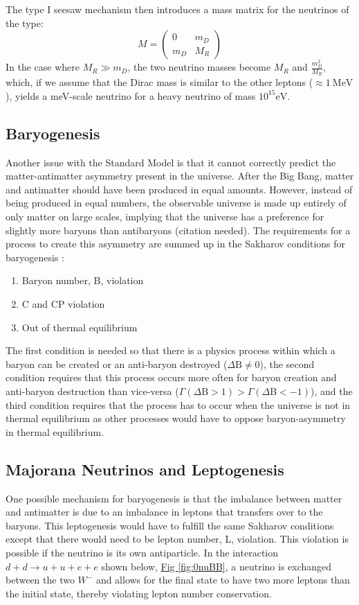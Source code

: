 \documentclass[12pt,a4paper]{article}
\begin{document}
The type I seesaw mechanism then introduces a mass matrix for the neutrinos of the type:
\begin{equation}
M =\begin{pmatrix}
0 & m_D \\
m_D & M_R
\end{pmatrix}
\end{equation}
In the case where $M_R \gg m_D$, the two neutrino masses become $M_R$ and $\frac{m_D^2}{M_R}$, which, if we assume that the Dirac mass is similar to the other leptons ($\approx 1~\textrm{MeV}$), yields a meV-scale neutrino for a heavy neutrino of mass $10^{15} \textrm{eV}$.

\subsection{Baryogenesis}

Another issue with the Standard Model is that it cannot correctly predict the matter-antimatter asymmetry present in the universe. After the Big Bang, matter and antimatter should have been produced in equal amounts. However, instead of being produced in equal numbers, the observable universe is made up entirely of only matter on large scales, implying that the universe has a preference for slightly more baryons than antibaryons (\color{blue}citation needed\color{black}). The requirements for a process to create this asymmetry are summed up in the Sakharov conditions for baryogenesis \cite{Sakharov}:
\begin{enumerate}
\item Baryon number, B, violation
\item C and CP violation
\item Out of thermal equilibrium
\end{enumerate}
The first condition is needed so that there is a physics process within which a baryon can be created or an anti-baryon destroyed ($\Delta \textrm{B}\neq0$), the second condition requires that this process occurs more often for baryon creation and anti-baryon destruction than vice-versa ($\Gamma(\Delta \textrm{B}>1) > \Gamma(\Delta \textrm{B}<-1)$), and the third condition requires that the process has to occur when the universe is not in thermal equilibrium as other processes would have to oppose baryon-asymmetry in thermal equilibrium.

\subsection{Majorana Neutrinos and Leptogenesis}
One possible mechanism for baryogenesis is that the imbalance between matter and antimatter is due to an imbalance in leptons that transfers over to the baryons. This leptogenesis would have to fulfill the same Sakharov conditions except that there would need to be lepton number, L, violation. This violation is possible if the neutrino is its own antiparticle. In the interaction $d + d \rightarrow u + u + e + e$ shown below,  \hyperref[fig:0nuBB]{Fig \ref*{fig:0nuBB}}, a neutrino is exchanged between the two $W^-$ and allows for the final state to have two more leptons than the initial state, thereby violating lepton number conservation.
\end{document}
